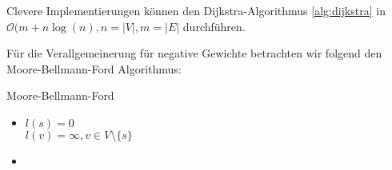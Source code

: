 \begin{remark}
Clevere Implementierungen können den Dijkstra-Algorithmus \ref{alg:dijkstra} in $\mathcal{O} (m+n\log(n), n=|V|, m=|E|$ durchführen.
\end{remark}
Für die Verallgemeinerung für negative Gewichte betrachten wir folgend den Moore-Bellmann-Ford Algorithmus: \\
\begin{algorithm}[H]
	\label{alg:mbf}
	\caption{Moore-Bellmann-Ford}
\begin{itemize}
	\item $l(s)=0$\\
	$l(v)=\infty, v \in V \setminus \{s\}$ 
\item {}
\end{itemize}
\end{algorithm}
